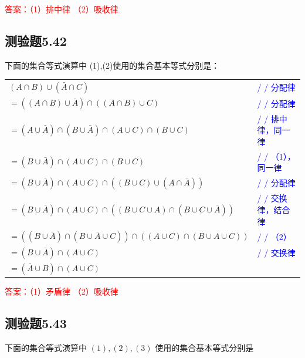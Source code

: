 \documentclass[UTF8, heading=true]{ctexart}
\begin{document}
\textcolor{red}{答案：（1）排中律 （2）吸收律}

\subsection{测验题5.42}

下面的集合等式演算中 (1),(2)使用的集合基本等式分别是：


\begin{table}[H]
  \centering
  \renewcommand{\arraystretch}{1.5}
  \begin{tabular}{ll}
    $(A \cap B) \cup (\bar{A} \cap C)$ & \textcolor{blue}{/ / 分配律} \\
    $=((A \cap B) \cup \bar{A}) \cap ((A \cap B) \cup C)$ & \textcolor{blue}{/ / 分配律} \\
    $=(A \cup \bar{A}) \cap (B \cup \bar{A}) \cap (A \cup C) \cap (B \cup C)$ & \textcolor{blue}{/ / 排中律，同一律} \\
    $=(B \cup \bar{A}) \cap (A \cup C) \cap (B \cup C)$ & \textcolor{blue}{/ / （1），同一律} \\
    $=(B \cup \bar{A}) \cap (A \cup C) \cap ((B \cup C) \cup (A \cap \bar{A}))$ & \textcolor{blue}{/ / 分配律} \\
    $=(B \cup \bar{A}) \cap (A \cup C) \cap ((B \cup C \cup A) \cap (B \cup C \cup \bar{A}))$ & \textcolor{blue}{/ / 交换律，结合律} \\
    $=((B \cup \bar{A}) \cap (B \cup \bar{A} \cup C)) \cap ((A \cup C) \cap (B \cup A \cup C))$ & \textcolor{blue}{/ / （2）} \\
    $=(B \cup \bar{A}) \cap (A \cup C)$ & \textcolor{blue}{/ / 交换律} \\
    $=(\bar{A} \cup B) \cap (A \cup C)$ &  \\
  \end{tabular}
\end{table}


\textcolor{red}
{
  答案：（1）矛盾律
  （2）吸收律
}


\subsection{测验题5.43}

下面的集合等式演算中 $(1),(2),(3)$ 使用的集合基本等式分别是
\end{document}
